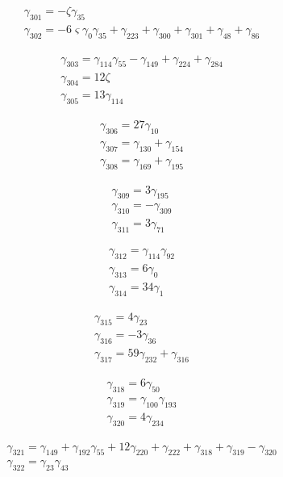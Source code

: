 \[\begin{aligned}\gamma_{301}=- \zeta  \gamma_{35}\\ \gamma_{302}=- 6 \varsigma  \gamma_{0} \gamma_{35} + \gamma_{223} + \gamma_{300} + \gamma_{301} + \gamma_{48} + \gamma_{86}\end{aligned}\]

\[\begin{aligned}\gamma_{303}=\gamma_{114} \gamma_{55} - \gamma_{149} + \gamma_{224} + \gamma_{284}\\ \gamma_{304}=12 \zeta \\ \gamma_{305}=13 \gamma_{114}\end{aligned}\]

\[\begin{aligned}\gamma_{306}=27 \gamma_{10}\\ \gamma_{307}=\gamma_{130} + \gamma_{154}\\ \gamma_{308}=\gamma_{169} + \gamma_{195}\end{aligned}\]

\[\begin{aligned}\gamma_{309}=3 \gamma_{195}\\ \gamma_{310}=- \gamma_{309}\\ \gamma_{311}=3 \gamma_{71}\end{aligned}\]

\[\begin{aligned}\gamma_{312}=\gamma_{114} \gamma_{92}\\ \gamma_{313}=6 \gamma_{0}\\ \gamma_{314}=34 \gamma_{1}\end{aligned}\]

\[\begin{aligned}\gamma_{315}=4 \gamma_{23}\\ \gamma_{316}=- 3 \gamma_{36}\\ \gamma_{317}=59 \gamma_{232} + \gamma_{316}\end{aligned}\]

\[\begin{aligned}\gamma_{318}=6 \gamma_{50}\\ \gamma_{319}=\gamma_{100} \gamma_{193}\\ \gamma_{320}=4 \gamma_{234}\end{aligned}\]

\[\begin{aligned}\gamma_{321}=\gamma_{149} + \gamma_{192} \gamma_{55} + 12 \gamma_{220} + \gamma_{222} + \gamma_{318} + \gamma_{319} - \gamma_{320}\\ \gamma_{322}=\gamma_{23} \gamma_{43}\end{aligned}\]

